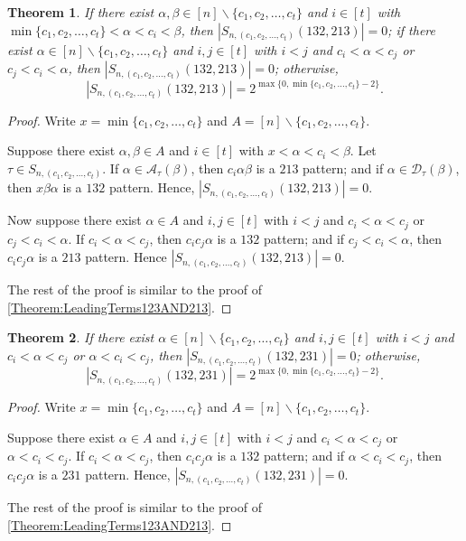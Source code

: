\documentclass[11pt]{article}
\newtheorem{theorem}{Theorem}[section]
\theoremstyle{definition}
\numberwithin{equation}{section}
\begin{document}
\begin{theorem}
If there exist $\alpha,\beta\in[n]\backslash\{c_1,c_2,\ldots,c_t\}$ and $i\in[t]$ with $\min\{c_1,c_2,\ldots,c_t\}<\alpha<c_i<\beta$, then $|S_{n,(c_1,c_2,\ldots,c_t)}(132,213)|=0$; if there exist $\alpha\in[n]\backslash\{c_1,c_2,\ldots,c_t\}$ and $i,j\in[t]$ with $i<j$ and $c_i<\alpha<c_j$ or $c_j<c_i<\alpha$, then $|S_{n,(c_1,c_2,\ldots,c_t)}(132,213)|=0$; otherwise,
\[
    |S_{n,(c_1,c_2,\ldots,c_t)}(132,213)|=2^{\max\{0,\min\{c_1,c_2,\ldots,c_t\}-2\}}.
    \]
\end{theorem}
\begin{proof}
    Write $x=\min\{c_1,c_2,\ldots,c_t\}$ and $A=[n]\backslash\{c_1,c_2,\ldots,c_t\}$.

    Suppose there exist $\alpha,\beta\in A$ and $i\in[t]$ with $x<\alpha<c_i<\beta$. Let $\tau\in S_{n,(c_1,c_2,\ldots,c_t)}$. If $\alpha\in\mathcal{A}_\tau(\beta)$, then $c_i\alpha\beta$ is a $213$ pattern; and if $\alpha\in\mathcal{D}_\tau(\beta)$, then $x\beta\alpha$ is a $132$ pattern. Hence, $|S_{n,(c_1,c_2,\ldots,c_t)}(132,213)|=0$.

    Now suppose there exist $\alpha\in A$ and $i,j\in[t]$ with $i<j$ and $c_i<\alpha<c_j$ or $c_j<c_i<\alpha$. If $c_i<\alpha<c_j$, then $c_ic_j\alpha$ is a $132$ pattern; and if $c_j<c_i<\alpha$, then $c_ic_j\alpha$ is a $213$ pattern. Hence $|S_{n,(c_1,c_2,\ldots,c_t)}(132,213)|=0$.

    The rest of the proof is similar to the proof of \cref{Theorem:LeadingTerms123AND213}.
\end{proof}

\begin{theorem}
If there exist $\alpha\in[n]\backslash\{c_1,c_2,\ldots,c_t\}$ and $i,j\in[t]$ with $i<j$ and $c_i<\alpha<c_j$ or $\alpha<c_i<c_j$, then $|S_{n,(c_1,c_2,\ldots,c_t)}(132,231)|=0$; otherwise,
\[
    |S_{n,(c_1,c_2,\ldots,c_t)}(132,231)|=2^{\max\{0,\min\{c_1,c_2,\ldots,c_t\}-2\}}.
    \]
\end{theorem}
\begin{proof}
    Write $x=\min\{c_1,c_2,\ldots,c_t\}$ and $A=[n]\backslash\{c_1,c_2,\ldots,c_t\}$.

    Suppose there exist $\alpha\in A$ and $i,j\in[t]$ with $i<j$ and $c_i<\alpha<c_j$ or $\alpha<c_i<c_j$. If $c_i<\alpha<c_j$, then $c_ic_j\alpha$ is a $132$ pattern; and if $\alpha<c_i<c_j$, then $c_ic_j\alpha$ is a $231$ pattern. Hence, $|S_{n,(c_1,c_2,\ldots,c_t)}(132,231)|=0$.

    The rest of the proof is similar to the proof of \cref{Theorem:LeadingTerms123AND213}.
\end{proof}
\end{document}
